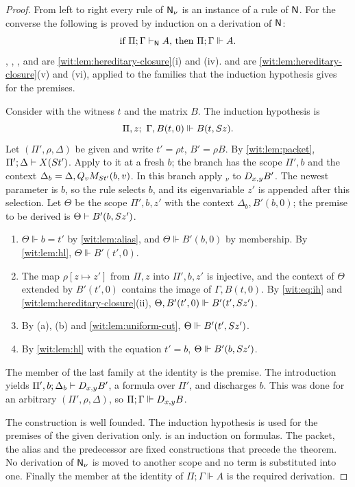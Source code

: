 \begin{proof}
From left to right every rule of $\mathsf{N}_{\nu}$ is an instance of a rule of
$\mathsf{N}$.  For the converse the following is proved by induction on a
derivation of $\mathsf{N}$:
\[
 \text{if }\Pi;\Gamma\vdash_{\mathsf{N}}A\text{, then }\Pi;\Gamma\Vdash A .
\]
, , ,  and
 are \cref{wit:lem:hereditary-closure}(i) and (iv).
 and  are
\cref{wit:lem:hereditary-closure}(v) and (vi), applied to the families that
the induction hypothesis gives for the premises.

Consider  with the witness $t$ and the matrix $B$.  The
induction hypothesis is
\begin{equation}
 \Pi,z;\ \Gamma,B(t,0)\Vdash B(t,\Suc z).
 \label{wit:eq:ih}
\end{equation}
Let $(\Pi',\rho,\Delta)$ be given and write $t'=\rho t$, $B'=\rho B$.
By \cref{wit:lem:packet}, $\Pi';\Delta\vdash X(S t')$.  Apply
 to it at a fresh $b$; the branch has the scope $\Pi',b$ and
the context $\Delta_b=\Delta,Q_{v}M_{S t'}(b,v)$.  In this branch apply
$_\nu$ to $D_{x,y}B'$.  The newest parameter is $b$, so the
rule selects $b$, and its eigenvariable $z'$ is appended after this
selection.  Let $\Theta$ be the scope $\Pi',b,z'$ with the context
$\Delta_b,B'(b,0)$; the premise to be derived is
$\Theta\vdash B'(b,S z')$.
\begin{enumerate}[label=\textup{(\alph*)}]
\item $\Theta\Vdash b=t'$ by \cref{wit:lem:alias}, and
 $\Theta\Vdash B'(b,0)$ by membership.  By \cref{wit:lem:hl},
 $\Theta\Vdash B'(t',0)$.
\item The map $\rho[z\mapsto z']$ from $\Pi,z$ into $\Pi',b,z'$ is
 injective, and the context of $\Theta$ extended by $B'(t',0)$ contains the
 image of $\Gamma,B(t,0)$.  By \eqref{wit:eq:ih} and
 \cref{wit:lem:hereditary-closure}(ii),
 $\Theta,B'(t',0)\Vdash B'(t',S z')$.
\item By (a), (b) and \cref{wit:lem:uniform-cut},
 $\Theta\Vdash B'(t',S z')$.
\item By \cref{wit:lem:hl} with the equation $t'=b$,
 $\Theta\Vdash B'(b,S z')$.
\end{enumerate}
The member of the last family at the identity is the premise.  The
introduction yields $\Pi',b;\Delta_b\vdash D_{x,y}B'$, a formula over
$\Pi'$, and  discharges $b$.  This was done for an arbitrary
$(\Pi',\rho,\Delta)$, so $\Pi;\Gamma\Vdash D_{x,y}B$.

The construction is well founded.  The induction hypothesis is used for the
premises of the given derivation only.   is an induction on
formulas.  The packet, the alias and the predecessor are fixed
constructions that precede the theorem.  No derivation of $\mathsf{N}_{\nu}$ is
moved to another scope and no term is substituted into one.  Finally the
member at the identity of $\Pi;\Gamma\Vdash A$ is the required derivation.
\end{proof}


